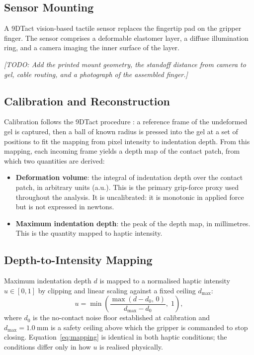 \documentclass[12pt, a4paper, twoside, openright]{report}
\newcommand{\todo}[1]{\textit{[TODO: #1]}}
\begin{document}
\subsection{Sensor Mounting}
\label{subsec:sensormount}

A 9DTact vision-based tactile sensor replaces the fingertip pad on the gripper
finger. The sensor comprises a deformable elastomer layer, a diffuse
illumination ring, and a camera imaging the inner surface of the layer.

\todo{Add the printed mount geometry, the standoff distance from camera to gel,
    cable routing, and a photograph of the assembled finger.}

\subsection{Calibration and Reconstruction}
\label{subsec:sensorcalib}

Calibration follows the 9DTact procedure \cite{lin2023}: a reference frame of the undeformed
gel is captured, then a ball of known radius is pressed into the gel at a set of
positions to fit the mapping from pixel intensity to indentation depth. From
this mapping, each incoming frame yields a depth map of the contact patch, from
which two quantities are derived:

\begin{itemize}
    \item \textbf{Deformation volume}: the integral of indentation depth over
          the contact patch, in arbitrary units (a.u.). This is the primary
          grip-force proxy used throughout the analysis. It is uncalibrated: it
          is monotonic in applied force but is not expressed in newtons.
    \item \textbf{Maximum indentation depth}: the peak of the depth map, in
          millimetres. This is the quantity mapped to haptic intensity.
\end{itemize}

\subsection{Depth-to-Intensity Mapping}
\label{subsec:mapping}

Maximum indentation depth $d$ is mapped to a normalised haptic intensity
$u \in [0,1]$ by clipping and linear scaling against a fixed ceiling
$d_{\max}$:
\begin{equation}
    u = \min\!\left(\frac{\max(d - d_0,\, 0)}{d_{\max} - d_0},\; 1\right),
    \label{eq:mapping}
\end{equation}
where $d_0$ is the no-contact noise floor established at calibration and
$d_{\max} = \SI{1.0}{\milli\metre}$ is a safety ceiling above which the gripper
is commanded to stop closing. Equation~\eqref{eq:mapping} is identical in both
haptic conditions; the conditions differ only in how $u$ is realised physically.
\end{document}
